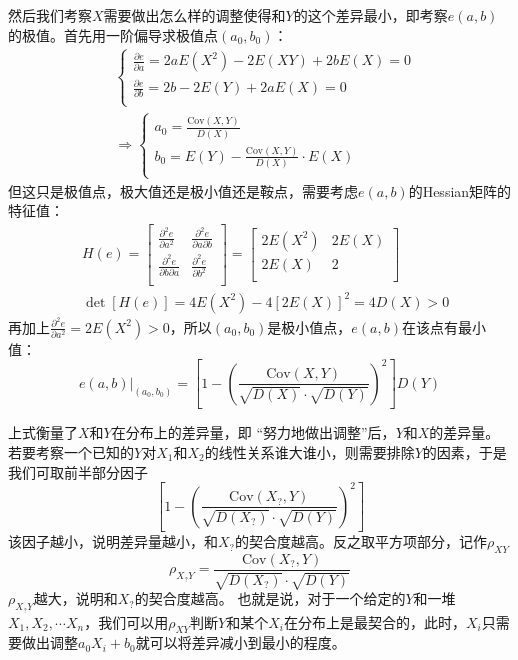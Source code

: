 然后我们考察$X$需要做出怎么样的调整使得和$Y$的这个差异最小，即考察$e\left( a,b \right) $的极值。首先用一阶偏导求极值点$\left( a_0,b_0 \right) $：
\begin{align*}
&\begin{cases}
	\frac{\partial e}{\partial a}=2aE\left( X^2 \right) -2E\left( XY \right) +2bE\left( X \right) =0\\
	\frac{\partial e}{\partial b}=2b-2E\left( Y \right) +2aE\left( X \right) =0\\
\end{cases} \\
&\Rightarrow \begin{cases}
	a_0=\frac{\mathrm{Cov}\left( X,Y \right)}{D\left( X \right)}\\
	b_0=E\left( Y \right) -\frac{\mathrm{Cov}\left( X,Y \right)}{D\left( X \right)}\cdot E\left( X \right)\\
\end{cases}
\end{align*}
但这只是极值点，极大值还是极小值还是鞍点，需要考虑$e\left( a,b \right) $的Hessian矩阵的特征值：
\begin{align*}
&H\left( e \right) =\left[ \begin{matrix}
	\frac{\partial ^2e}{\partial a^2}&		\frac{\partial ^2e}{\partial a\partial b}\\
	\frac{\partial ^2e}{\partial b\partial a}&		\frac{\partial ^2e}{\partial b^2}\\
\end{matrix} \right] =\left[ \begin{matrix}
	2E\left( X^2 \right)&		2E\left( X \right)\\
	2E\left( X \right)&		2\\
\end{matrix} \right] \\
&\det \left[ H\left( e \right) \right] =4E\left( X^2 \right) -4\left[ 2E\left( X \right) \right] ^2=4D\left( X \right) >0
\end{align*}
再加上$\frac{\partial ^2e}{\partial a^2}=2E\left( X^2 \right) >0$，所以$\left( a_0,b_0 \right) $是极小值点，$e\left( a,b \right) $在该点有最小值：
\[
\left. e\left( a,b \right) \right|_{\left( a_0,b_0 \right)}=\left[ 1-\left( \frac{\mathrm{Cov}\left( X,Y \right)}{\sqrt{D\left( X \right)}\cdot \sqrt{D\left( Y \right)}} \right) ^2 \right] D\left( Y \right)
\]

上式衡量了$X$和$Y$在分布上的差异量，即 “努力地做出调整”后，$Y$和$X$的差异量。
若要考察一个已知的$Y$对$X_1$和$X_2$的线性关系谁大谁小，则需要排除$Y$的因素，于是我们可取前半部分因子
\[
\left[ 1-\left( \frac{\mathrm{Cov}\left( X_?,Y \right)}{\sqrt{D\left( X_? \right)}\cdot \sqrt{D\left( Y \right)}} \right) ^2 \right]
\]
该因子越小，说明差异量越小，和$X_?$的契合度越高。反之取平方项部分，记作$\rho _{XY}$
\[
\rho _{X_?Y}=\frac{\mathrm{Cov}\left( X_?,Y \right)}{\sqrt{D\left( X_? \right)}\cdot \sqrt{D\left( Y \right)}}
\]
$\rho _{X_?Y}$越大，说明和$X_?$的契合度越高。
也就是说，对于一个给定的$Y$和一堆$X_1,X_2,\cdots X_n$，我们可以用$\rho _{XY}$判断$Y$和某个$X_i$在分布上是最契合的，此时，$X_i$只需要做出调整$a_0X_i+b_0$就可以将差异减小到最小的程度。

